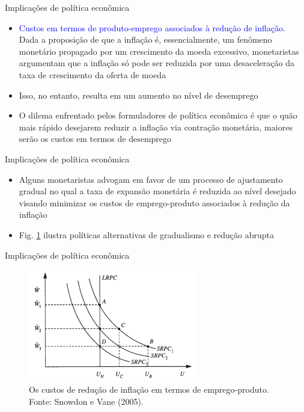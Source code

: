 \documentclass[10pt]{beamer}
\begin{document}
\begin{frame}{Implicações de política econômica}
    \begin{itemize}
        \item \textcolor{blue}{Custos em termos de produto-emprego associados à redução de inflação}. Dada a proposição de que a inflação é, essencialmente, um fenômeno monetário propagado por um crescimento da moeda excessivo, monetaristas argumentam que a inflação só pode ser reduzida por uma desaceleração da taxa de crescimento da oferta de moeda
        \bigskip
        \item Isso, no entanto, resulta em um aumento no nível de desemprego
        \bigskip
        \item O dilema enfrentado pelos formuladores de política econômica é que o quão mais rápido desejarem reduzir a inflação via contração monetária, maiores serão os custos em termos de desemprego
    \end{itemize}    
\end{frame}

\begin{frame}{Implicações de política econômica}
    \begin{itemize}
        \item Alguns monetaristas advogam em favor de um processo de ajustamento gradual no qual a taxa de expansão monetária é reduzida ao nível desejado visando minimizar os custos de emprego-produto associados à redução da inflação
        \bigskip
        \item Fig. \ref{fig13} ilustra políticas alternativas de gradualismo e redução abrupta
    \end{itemize}    
\end{frame}

\begin{frame}{Implicações de política econômica}
    \begin{figure}
        \centering
        \includegraphics[width=0.65\textwidth]{./figures/aula10_fig13.PNG}
        \caption{Os custos de redução de inflação em termos de emprego-produto. Fonte: Snowdon e Vane (2005).}
        \label{fig13}
    \end{figure}
\end{frame}
\end{document}
